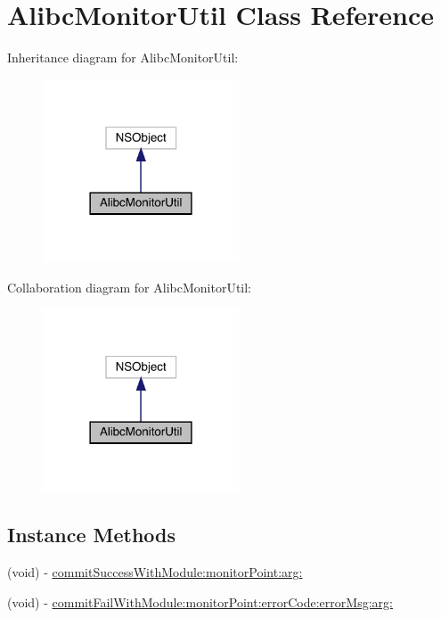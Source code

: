 \hypertarget{interface_alibc_monitor_util}{}\section{Alibc\+Monitor\+Util Class Reference}
\label{interface_alibc_monitor_util}


Inheritance diagram for Alibc\+Monitor\+Util\+:\nopagebreak
\begin{figure}[H]
\begin{center}
\leavevmode
\includegraphics[width=165pt]{interface_alibc_monitor_util__inherit__graph}
\end{center}
\end{figure}


Collaboration diagram for Alibc\+Monitor\+Util\+:\nopagebreak
\begin{figure}[H]
\begin{center}
\leavevmode
\includegraphics[width=165pt]{interface_alibc_monitor_util__coll__graph}
\end{center}
\end{figure}
\subsection*{Instance Methods}
\begin{DoxyCompactItemize}
\item 
(void) -\/ \mbox{\hyperlink{interface_alibc_monitor_util_aa86f4545fbfe7561b54cabdfe1803da9}{commit\+Success\+With\+Module\+:monitor\+Point\+:arg\+:}}
\item 
(void) -\/ \mbox{\hyperlink{interface_alibc_monitor_util_a1ca43b26e44abc9aee37454a3c03f853}{commit\+Fail\+With\+Module\+:monitor\+Point\+:error\+Code\+:error\+Msg\+:arg\+:}}
\end{DoxyCompactItemize}
